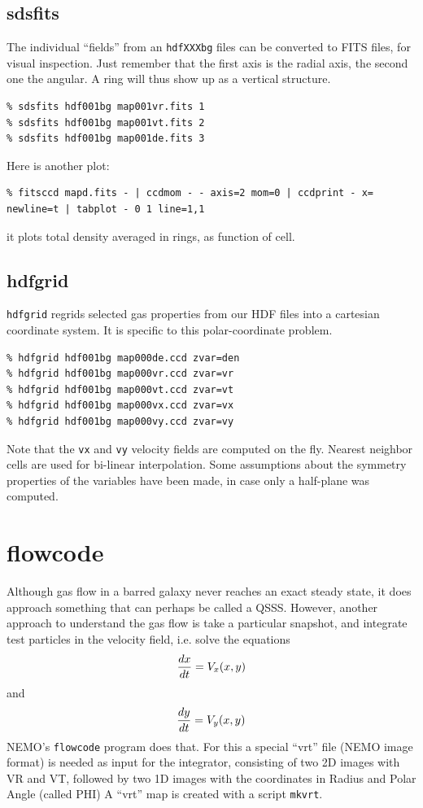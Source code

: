 \documentclass[10pt,dvips]{article}
\begin{document}
\subsection{sdsfits}

The individual ``fields'' from an {\tt hdfXXXbg} files can be converted to FITS files,
for visual inspection. Just remember that the first axis is the radial axis, the
second one the angular.  A ring will thus show up as a vertical structure.

\footnotesize\begin{verbatim}
% sdsfits hdf001bg map001vr.fits 1
% sdsfits hdf001bg map001vt.fits 2
% sdsfits hdf001bg map001de.fits 3
\end{verbatim}\normalsize

Here is another plot:
\footnotesize\begin{verbatim}
% fitsccd mapd.fits - | ccdmom - - axis=2 mom=0 | ccdprint - x= newline=t | tabplot - 0 1 line=1,1
\end{verbatim}\normalsize
it plots total density averaged in rings, as function of cell.

\subsection{hdfgrid}

{\tt hdfgrid}
regrids selected gas properties from our 
HDF files into a cartesian coordinate system. 
It is specific to this polar-coordinate problem.

\footnotesize\begin{verbatim}
% hdfgrid hdf001bg map000de.ccd zvar=den
% hdfgrid hdf001bg map000vr.ccd zvar=vr
% hdfgrid hdf001bg map000vt.ccd zvar=vt
% hdfgrid hdf001bg map000vx.ccd zvar=vx
% hdfgrid hdf001bg map000vy.ccd zvar=vy
\end{verbatim}\normalsize

Note that the {\tt vx} and {\tt vy} velocity fields
are computed on the fly. Nearest neighbor cells are
used for bi-linear interpolation. Some assumptions
about the symmetry properties of the variables
have been made, in case only a half-plane was
computed.



\section{flowcode}

Although gas flow in a barred galaxy never reaches an
exact steady state, it does approach something
that can perhaps be called a QSSS. However, another approach
to understand the gas flow is take a particular snapshot, and
integrate test particles in the velocity field, i.e.
solve the equations
$$
	{dx \over dt } = V_x(x,y)
$$
and
$$
	{dy \over dt } = V_y(x,y)
$$
NEMO's {\tt flowcode} program does that. For this a special
``vrt'' file (NEMO image format) is needed as input for the
integrator, consisting
of two 2D images with VR and VT, followed by two 1D images
with the coordinates in Radius and Polar Angle (called PHI)
A ``vrt'' map is created with a script {\tt mkvrt}.
\end{document}
